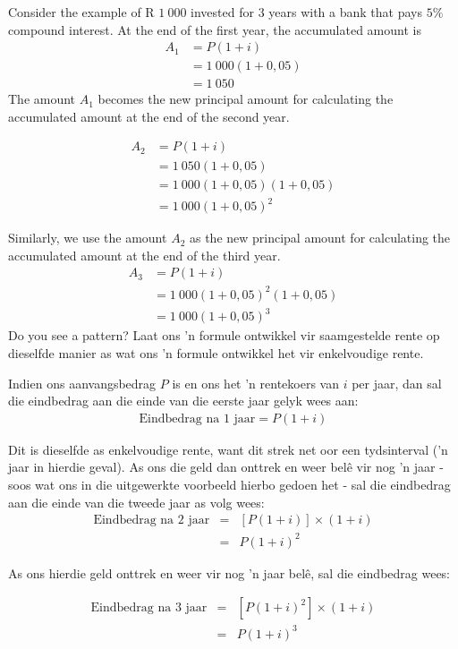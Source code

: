 Consider the example of R $1~000$ invested for $3$ years with a bank that pays $5\%$ compound interest.
At the end of the first year, the accumulated amount is 
\begin{align*}
  A_1 &= P(1 + i)\\
  &= 1~000(1+0,05)\\
  &=1~050
\end{align*}
The amount $A_1$ becomes the new principal amount for calculating the accumulated amount at the end of the second year.

\begin{align*}
    A_2 &= P(1 + i)\\
&= 1~050(1+0,05)\\
&=1~000(1+0,05)(1+0,05)\\
&= 1~000(1+0,05)^2
\end{align*}

Similarly, we use the amount $A_2$ as the new principal amount for calculating the accumulated amount at the end of the third year.
\begin{align*}
    A_3 &= P(1 + i)\\
&=1~000(1+0,05)^2(1+0,05)\\
&= 1~000(1+0,05)^3
\end{align*}
Do you see a pattern? Laat ons ’n formule ontwikkel vir saamgestelde rente op dieselfde manier as wat ons ’n formule ontwikkel het vir
enkelvoudige rente.\par

Indien ons aanvangsbedrag $P$ is en ons het ’n rentekoers van $i$ per jaar, dan sal die eindbedrag aan die einde
van die eerste jaar gelyk wees aan:
\begin{eqnarray*}
    \mbox{Eindbedrag na 1 jaar} = P(1 + i)
\end{eqnarray*}

Dit is dieselfde as enkelvoudige rente, want dit strek net oor een tydsinterval (’n jaar in hierdie geval). As ons die
geld dan onttrek en weer belê vir nog ’n jaar - soos wat ons in die uitgewerkte voorbeeld hierbo gedoen het - sal
die eindbedrag aan die einde van die tweede jaar as volg wees:
\begin{eqnarray*}
    \mbox{Eindbedrag na 2 jaar} &=& [P(1 + i)] \times (1 + i)\\
    &=& P(1 + i)^2
\end{eqnarray*}

As ons hierdie geld onttrek en weer vir nog ’n jaar belê, sal die eindbedrag wees:

\begin{eqnarray*}
    \mbox{Eindbedrag na 3 jaar} &=& [P(1 + i)^2] \times (1 + i)\\
    &=& P(1 + i)^3
\end{eqnarray*}

